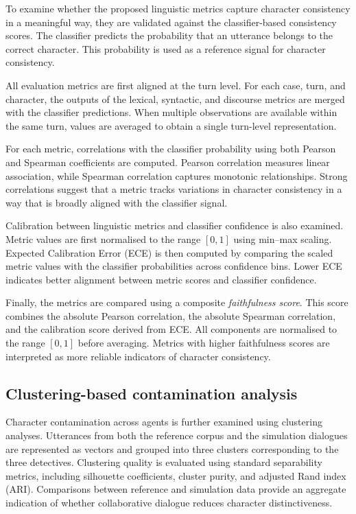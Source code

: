 \documentclass{article}
\begin{document}
To examine whether the proposed linguistic metrics capture character consistency in a meaningful way, they are validated against the classifier-based consistency scores. The classifier predicts the probability that an utterance belongs to the correct character. This probability is used as a reference signal for character consistency.

All evaluation metrics are first aligned at the turn level. For each case, turn, and character, the outputs of the lexical, syntactic, and discourse metrics are merged with the classifier predictions. When multiple observations are available within the same turn, values are averaged to obtain a single turn-level representation.

For each metric, correlations with the classifier probability using both Pearson and Spearman coefficients are computed. Pearson correlation measures linear association, while Spearman correlation captures monotonic relationships. Strong correlations suggest that a metric tracks variations in character consistency in a way that is broadly aligned with the classifier signal.

Calibration between linguistic metrics and classifier confidence is also examined. Metric values are first normalised to the range $[0,1]$ using min–max scaling. Expected Calibration Error (ECE) is then computed by comparing the scaled metric values with the classifier probabilities across confidence bins. Lower ECE indicates better alignment between metric scores and classifier confidence.

Finally, the metrics are compared using a composite \textit{faithfulness score}. This score combines the absolute Pearson correlation, the absolute Spearman correlation, and the calibration score derived from ECE. All components are normalised to the range $[0,1]$ before averaging. Metrics with higher faithfulness scores are interpreted as more reliable indicators of character consistency.


\subsection{Clustering-based contamination analysis}

Character contamination across agents is further examined using clustering analyses. Utterances from both the reference corpus and the simulation dialogues are represented as vectors and grouped into three clusters corresponding to the three detectives. Clustering quality is evaluated using standard separability metrics, including silhouette coefficients, cluster purity, and adjusted Rand index (ARI). Comparisons between reference and simulation data provide an aggregate indication of whether collaborative dialogue reduces character distinctiveness.
\end{document}
